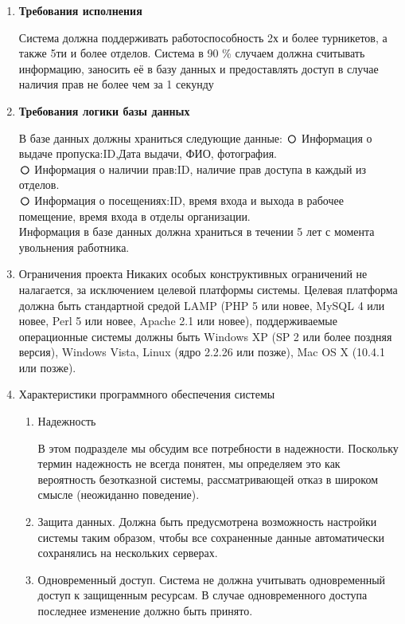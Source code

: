 \documentclass[12pt]{article} %
\def\circmark{\mathbin{\scalerel*{\circ}{j}}}
\begin{document}
\begin{enumerate}
\begin{enumerate}
  		 
  			\item \begin{large} \textbf{Требования исполнения} \end{large} \newline
  			   Система должна поддерживать работоспособность 2х и более турникетов, а также 5ти и более отделов.
  			   Система в 90 \% случаем должна считывать информацию, заносить её в базу данных и предоставлять доступ в случае наличия прав не более чем за 1 секунду  
  			
  		\item \begin{large} \textbf{Требования логики базы данных} \end{large} \newline
  			В базе данных должны храниться следующие данные:
  		 $\circmark $ Информация о выдаче пропуска:ID,Дата выдачи, ФИО, фотография.\newline\\ 
  		 $\circmark $ Информация о наличии прав:ID, наличие прав доступа в каждый из отделов.\newline\\ 
  		 $\circmark $ Информация о посещениях:ID, время входа и выхода в рабочее помещение, время входа в отделы организации.\newline\\ 
  		  Информация в базе данных должна храниться в течении 5 лет с момента увольнения работника.
  		  		
  		\item Ограничения проекта
  		   Никаких особых конструктивных ограничений не налагается, за исключением целевой платформы системы. Целевая платформа должна быть стандартной средой LAMP (PHP 5 или новее, MySQL 4 или новее, Perl 5 или новее, Apache 2.1 или новее), поддерживаемые операционные системы должны быть Windows XP (SP 2 или более поздняя версия), Windows Vista, Linux (ядро 2.2.26 или позже), Mac OS X (10.4.1 или позже).
  		
  		\item Характеристики программного обеспечения системы
  			\begin{enumerate}
  				\item Надежность
  				
  				В этом подразделе мы обсудим все потребности в надежности. Поскольку термин надежность не всегда понятен,
  				мы определяем это как вероятность безотказной системы, рассматривающей отказ в широком смысле (неожиданно
  				поведение).
  		      \item Защита данных. 
  				Должна быть предусмотрена возможность настройки системы таким образом, чтобы все сохраненные данные автоматически сохранялись на нескольких серверах.
  		 \item	Одновременный доступ.
  			Система не должна учитывать одновременный доступ к защищенным ресурсам. В случае одновременного доступа	последнее изменение должно быть принято.
  			

\end{enumerate}
\end{enumerate}
\end{enumerate}
\end{document}
